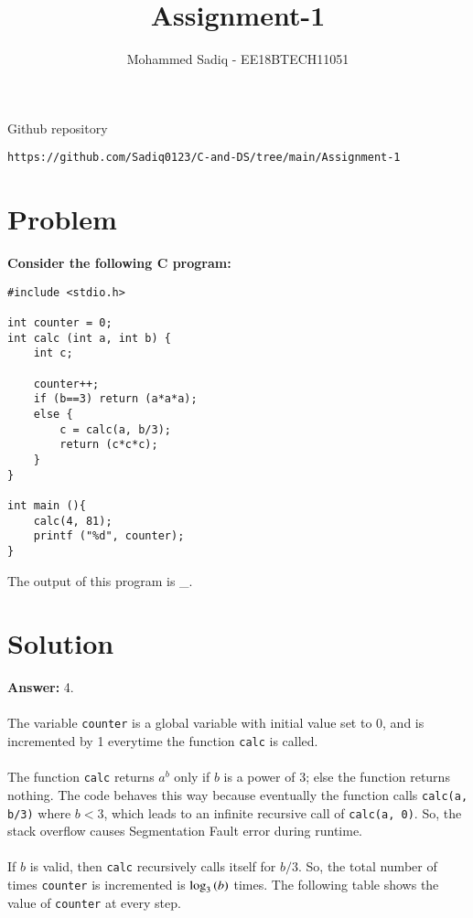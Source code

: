 \documentclass[journal,12pt,twocolumn]{IEEEtran}
\begin{document}
\def\putbox#1#2#3{\makebox[0in][l]{\makebox[#1][l]{}\raisebox{\baselineskip}[0in][0in]{\raisebox{#2}[0in][0in]{#3}}}}
     \def\rightbox#1{\makebox[0in][r]{#1}}
     \def\centbox#1{\makebox[0in]{#1}}
     \def\topbox#1{\raisebox{-\baselineskip}[0in][0in]{#1}}
     \def\midbox#1{\raisebox{-0.5\baselineskip}[0in][0in]{#1}}
\vspace{3cm}
\title{Assignment-1}
\author{Mohammed Sadiq - EE18BTECH11051}
\maketitle
\newpage
\bigskip
\renewcommand{\thefigure}{\theenumi}
\renewcommand{\thetable}{\theenumi}
Github repository
\begin{lstlisting}
https://github.com/Sadiq0123/C-and-DS/tree/main/Assignment-1
\end{lstlisting}
%

\section{\textbf{Problem}}

\textbf{Consider the following C program:}
\begin{tcolorbox}

\begin{verbatim}
#include <stdio.h> 

int counter = 0; 
int calc (int a, int b) { 
    int c; 
 
    counter++; 
    if (b==3) return (a*a*a); 
    else { 
        c = calc(a, b/3); 
        return (c*c*c); 
    } 
} 
 
int main (){ 
    calc(4, 81); 
    printf ("%d", counter); 
}
\end{verbatim}

\end{tcolorbox}

The output of this program is \_.


\section{\textbf{Solution}}
\textbf{Answer:} 4.
\\~\\
The variable \texttt{counter} is a global variable with initial value set to 0, and is incremented by 1 everytime the function \texttt{calc} is called.
\\~\\ 
The function \texttt{calc} returns $a^b$ only if $b$ is a power of 3; else the function returns nothing. The code behaves this way because eventually the function calls \texttt{calc(a, b/3)} where $b<3$, which leads to an infinite recursive call of \texttt{calc(a, 0)}. So, the stack overflow causes Segmentation Fault error during runtime.
\\~\\ 
If $b$ is valid, then \texttt{calc} recursively calls itself for $b/3$. So, the total number of times \texttt{counter} is incremented is $\log_3\left(b\right)$ times. The following table shows the value of \texttt{counter} at every step.
\end{document}
